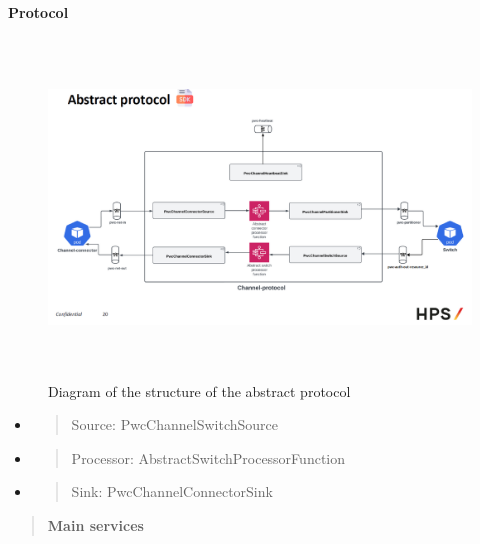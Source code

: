 \documentclass[12pt,a4paper]{report}
\begin{document}
  \textbf{Protocol}


\begin{figure}[H]
\centering
\includegraphics[width=6.31605in,height=3.54559in]{media/image32.png}
\caption{Diagram of the
structure of the abstract protocol}
\label{fig:diagramAbPo}
\end{figure}

\begin{itemize}
\item
  \begin{quote}
  Source: PwcChannelSwitchSource
  \end{quote}
\item
  \begin{quote}
  Processor: AbstractSwitchProcessorFunction
  \end{quote}
\item
  \begin{quote}
  Sink: PwcChannelConnectorSink
  \end{quote}
\end{itemize}

\begin{quote}
\textbf{Main services}
\end{quote}
\end{document}
